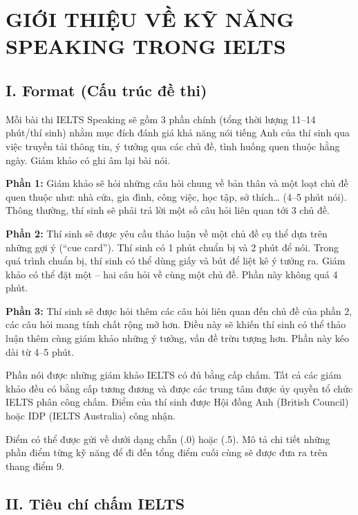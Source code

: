 
\section*{GIỚI THIỆU VỀ KỸ NĂNG SPEAKING TRONG IELTS}
\label{sec:Intro}

\subsection*{I. Format (Cấu trúc đề thi)}

Mỗi bài thi IELTS Speaking sẽ gồm 3 phần chính (tổng thời lượng 11–14 phút/thí sinh) 
nhằm mục đích đánh giá khả năng nói tiếng Anh của thí sinh qua việc truyền tải thông tin, 
ý tưởng qua các chủ đề, tình huống quen thuộc hằng ngày. 
Giám khảo có ghi âm lại bài nói.

\bigskip
\textbf{Phần 1:}  
Giám khảo sẽ hỏi những câu hỏi chung về bản thân và một loạt chủ đề quen thuộc như: nhà cửa, gia đình, công việc, học tập, sở thích… (4–5 phút nói).  
Thông thường, thí sinh sẽ phải trả lời một số câu hỏi liên quan tới 3 chủ đề.

\bigskip
\textbf{Phần 2:}  
Thí sinh sẽ được yêu cầu thảo luận về một chủ đề cụ thể dựa trên những gợi ý (``cue card'').  
Thí sinh có 1 phút chuẩn bị và 2 phút để nói. Trong quá trình chuẩn bị, thí sinh có thể dùng giấy và bút để liệt kê ý tưởng ra.  
Giám khảo có thể đặt một – hai câu hỏi về cùng một chủ đề.  
Phần này không quá 4 phút.

\bigskip
\textbf{Phần 3:}  
Thí sinh sẽ được hỏi thêm các câu hỏi liên quan đến chủ đề của phần 2, các câu hỏi mang tính chất rộng mở hơn.  
Điều này sẽ khiến thí sinh có thể thảo luận thêm cùng giám khảo những ý tưởng, vấn đề trừu tượng hơn.  
Phần này kéo dài từ 4–5 phút.

\bigskip
Phần nói được những giám khảo IELTS có đủ bằng cấp chấm. 
Tất cả các giám khảo đều có bằng cấp tương đương và được các trung tâm được ủy quyền tổ chức IELTS phân công chấm.  
Điểm của thí sinh được Hội đồng Anh (British Council) hoặc IDP (IELTS Australia) công nhận.

\bigskip
Điểm có thể được gửi về dưới dạng chẵn (.0) hoặc (.5). 
Mô tả chi tiết những phần điểm từng kỹ năng để đi đến tổng điểm cuối cùng sẽ được đưa ra trên thang điểm 9.

\subsection*{II. Tiêu chí chấm IELTS}

